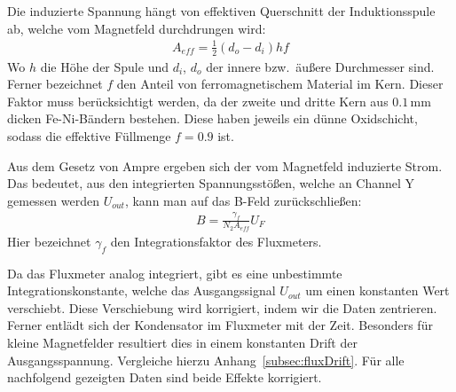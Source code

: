 \documentclass[a4paper,10pt,twocolumn]{article}
\newcommand{\stripThickness}{$0.1 \, \text{mm}$ }
\begin{document}
    Die induzierte Spannung hängt von effektiven Querschnitt der Induktionsspule ab, welche vom Magnetfeld
    durchdrungen wird:
    \begin{align}
        \label{eq:EffectiveAreaOfInductionCoil}
        A_{eff} = \frac{1}{2} (d_o - d_i) h f
    \end{align}
    Wo $h$ die Höhe der Spule und $d_i$, $d_o$ der innere bzw.\ äußere Durchmesser sind.
    Ferner bezeichnet $f$ den Anteil von ferromagnetischem Material im Kern.
    Dieser Faktor muss berücksichtigt werden, da der zweite und dritte Kern aus \stripThickness dicken
    Fe-Ni-Bändern bestehen.
    Diese haben jeweils ein dünne Oxidschicht, sodass die effektive Füllmenge $f = 0.9$ ist.
    
%    
    
    Aus dem Gesetz von Ampre ergeben sich der vom Magnetfeld induzierte Strom.
    Das bedeutet, aus den integrierten Spannungsstößen, welche an Channel Y gemessen werden $U_{out}$, kann man
    auf das B-Feld zurückschließen:
    \begin{align}
        \label{eq:CalculateBField}
        B = \frac{\gamma_f}{N_2 A_{eff}} U_{F}
    \end{align}
    Hier bezeichnet $\gamma_f$ den Integrationsfaktor des Fluxmeters.
    
    Da das Fluxmeter analog integriert, gibt es eine unbestimmte Integrationskonstante, welche das Ausgangssignal $U_{out}$
    um einen konstanten Wert verschiebt.
    Diese Verschiebung wird korrigiert, indem wir die Daten zentrieren.
    Ferner entlädt sich der Kondensator im Fluxmeter mit der Zeit.
    Besonders für kleine Magnetfelder resultiert dies in einem konstanten Drift der Ausgangsspannung.
    Vergleiche hierzu Anhang~\ref{subsec:fluxDrift}.
    Für alle nachfolgend gezeigten Daten sind beide Effekte korrigiert.
    
\end{document}
